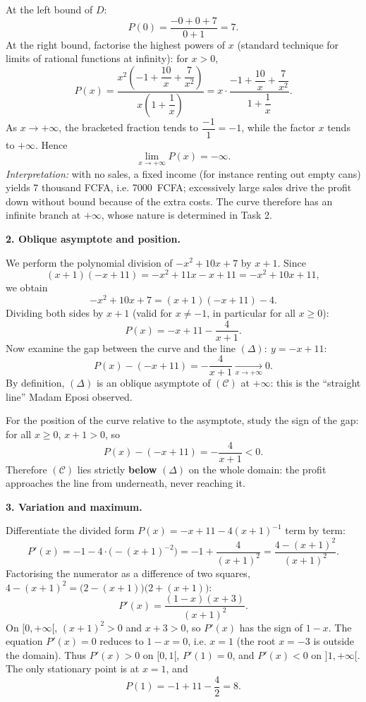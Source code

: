 \documentclass[11pt]{article}
\newcommand{\cle}[1]{{\popxbold\color{popdark}#1}}
\begin{document}
At the left bound of $D$:
\[
P(0)=\frac{-0+0+7}{0+1}=7.
\]
At the right bound, factorise the highest powers of $x$ (standard technique for limits of rational functions at infinity): for $x>0$,
\[
P(x)=\frac{x^{2}\left(-1+\dfrac{10}{x}+\dfrac{7}{x^{2}}\right)}{x\left(1+\dfrac{1}{x}\right)}
=x\cdot\frac{-1+\dfrac{10}{x}+\dfrac{7}{x^{2}}}{1+\dfrac{1}{x}}.
\]
As $x\to+\infty$, the bracketed fraction tends to $\dfrac{-1}{1}=-1$, while the factor $x$ tends to $+\infty$. Hence
\[
\lim_{x\to+\infty}P(x)=-\infty .
\]
\emph{Interpretation:} with no sales, a fixed income (for instance renting out empty cans) yields $7$ thousand FCFA, i.e. \SI{7000}{FCFA}; excessively large sales drive the profit down without bound because of the extra costs. The curve therefore has an \cle{infinite branch} at $+\infty$, whose nature is determined in Task 2.

\textbf{2. Oblique asymptote and position.}\par
We perform the polynomial division of $-x^{2}+10x+7$ by $x+1$. Since
\[
(x+1)(-x+11)=-x^{2}+11x-x+11=-x^{2}+10x+11,
\]
we obtain
\[
-x^{2}+10x+7=(x+1)(-x+11)-4.
\]
Dividing both sides by $x+1$ (valid for $x\neq -1$, in particular for all $x\ge 0$):
\[
P(x)=-x+11-\frac{4}{x+1}.
\]
Now examine the gap between the curve and the line $(\Delta):\ y=-x+11$:
\[
P(x)-(-x+11)=-\frac{4}{x+1}\xrightarrow[x\to+\infty]{}0.
\]
By definition, $(\Delta)$ is an \cle{oblique asymptote} of $(\mathcal{C})$ at $+\infty$: this is the ``straight line'' Madam Eposi observed.

For the \cle{position of the curve} relative to the asymptote, study the sign of the gap: for all $x\ge 0$, $x+1>0$, so
\[
P(x)-(-x+11)=-\frac{4}{x+1}<0.
\]
Therefore $(\mathcal{C})$ lies strictly \textbf{below} $(\Delta)$ on the whole domain: the profit approaches the line from underneath, never reaching it.

\textbf{3. Variation and maximum.}\par
Differentiate the divided form $P(x)=-x+11-4(x+1)^{-1}$ term by term:
\[
P'(x)=-1-4\cdot\bigl(-(x+1)^{-2}\bigr)=-1+\frac{4}{(x+1)^{2}}=\frac{4-(x+1)^{2}}{(x+1)^{2}}.
\]
Factorising the numerator as a difference of two squares, $4-(x+1)^{2}=\bigl(2-(x+1)\bigr)\bigl(2+(x+1)\bigr)$:
\[
P'(x)=\frac{(1-x)(x+3)}{(x+1)^{2}}.
\]
On $[0,+\infty[$, $(x+1)^{2}>0$ and $x+3>0$, so $P'(x)$ has the sign of $1-x$. The equation $P'(x)=0$ reduces to $1-x=0$, i.e. $x=1$ (the root $x=-3$ is outside the domain). Thus $P'(x)>0$ on $[0,1[$, $P'(1)=0$, and $P'(x)<0$ on $]1,+\infty[$. The only \cle{stationary point} is at $x=1$, and
\[
P(1)=-1+11-\frac{4}{2}=8.
\]
\end{document}
